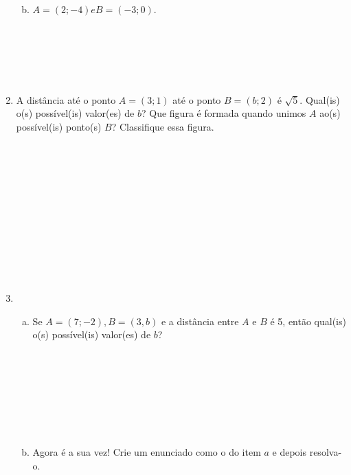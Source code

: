 \documentclass[a4paper,14pt]{article}
\begin{document}
\begin{multicols}{2}
\begin{enumerate}
\begin{enumerate}[a)]
    			\\\\\\\\\\\\\\
    			\item $A = (2; -4) e B = (-3; 0)$.
    			\\\\\\\\\\\\			
    	    \end{enumerate}
            \item A distância até o ponto $A = (3; 1)$ até o ponto $B = (b; 2)$ é $\sqrt{5}$. Qual(is) o(s) possível(is) valor(es) de $b$? Que figura é formada quando unimos $A$ ao(s) possível(is) ponto(s) $B$? Classifique essa figura. \\\\\\\\\\\\\\\\\\\\\\\\
            \item \begin{enumerate}[a)]
            	\item Se $A = (7; -2), B = (3, b)$ e a distância entre $A$ e $B$ é 5, então qual(is) o(s) possível(is) valor(es) de $b$? \\\\\\\\\\\\\\\\
            	\item Agora é a sua vez! Crie um enunciado como o do item $a$ e depois resolva-o. \\\\\\\\\\\\\\
            \end{enumerate}

\end{enumerate}
\end{multicols}
\end{document}

